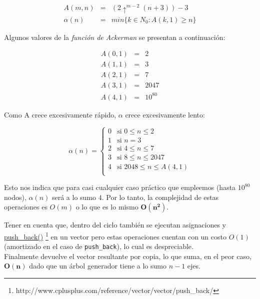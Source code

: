 \begin{equation*}
\begin{array}{lll}
A(m,n) & = & (2\uparrow^{m-2}(n+3))-3 \\
\alpha(n) & = & min\{k \in N_0 : A(k,1) \geq n\}
\end{array}
\end{equation*}

	Algunos valores de la \emph{funci\'on de Ackerman} se presentan a continuaci\'on:

\begin{equation*}
\begin{array}{lll}
A(0,1) & = & 2 \\
A(1,1) & = & 3 \\
A(2,1) & = & 7 \\
A(3,1) & = & 2047 \\
A(4,1) & = & 10^{80}
\end{array}
\end{equation*}

	Como A crece excesivamente r\'apido, $\alpha$ crece excesivamente lento:

	\begin{equation*}
	\alpha(n) = 
	\begin{cases} 
		0  & \mbox{si } 0 \leq n \leq 2 \\
		1  & \mbox{si } n = 3 \\
		2  & \mbox{si } 4 \leq n \leq 7 \\
		3  & \mbox{si } 8 \leq n \leq 2047 \\
		4  & \mbox{si } 2048 \leq n \leq A(4,1) \\
	\end{cases}
	\end{equation*}

	Esto nos indica que para casi cualquier caso pr\'actico que empleemos (hasta $10^{80}$ nodos), $\alpha(n)$ ser\'a a lo sumo $4$. Por lo tanto, la complejidad de estas operaciones es $O(m)$ o lo que es lo mismo $\mathbf{O(n^2)}$.
	
	Tener en cuenta que, dentro del ciclo tambi\'en se ejecutan asignaciones y \href{http://www.cplusplus.com/reference/vector/vector/push_back/}{push\_back()} \footnote{http://www.cplusplus.com/reference/vector/vector/push_back/} en un vector pero estas operaciones cuentan con un costo $O(1)$ (amortizado en el caso de \texttt{push\_back}), lo cual es despreciable.\\

	Finalmente devuelve el vector resultante por copia, lo que suma, en el peor caso, $\mathbf{O(n)}$ dado que un \'arbol generador tiene a lo sumo $n-1$ ejes.\\

